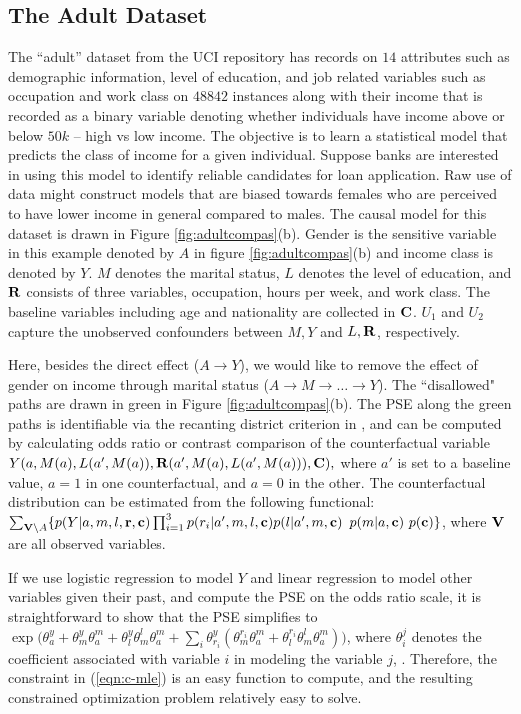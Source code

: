 \documentclass[letterpaper]{article} %
\newcommand{\citep}{\cite}
\newcommand{\T}{\theta}
\begin{document}
\subsection{The Adult Dataset}
The ``adult'' dataset from the UCI repository has records on $14$ attributes such as demographic information, level of education, and job related variables such as occupation and work class on $48842$ instances along with their income that is recorded as a binary variable denoting whether individuals have income above or below $50k$ -- high vs low income. The objective is to learn a statistical model that predicts the class of income for a given individual. Suppose  banks are interested in using this model to identify reliable candidates for loan application. Raw use of data might construct models that are biased towards females who are perceived to have lower income in general compared to males. The causal model for this dataset is drawn in Figure \ref{fig:adultcompas}(b). Gender is the sensitive variable in this example denoted by $A$ in figure \ref{fig:adultcompas}(b) and income class is denoted by $Y$. $M$ denotes the marital status, $L$ denotes the level of education, and $\bf R$ consists of three variables, occupation, hours per week, and work class. The baseline variables including age and nationality are collected in $\bf C$. $U_1$ and $U_2$ capture the unobserved confounders between $M,Y$ and $L, \bf R$, respectively. 

Here, besides the direct effect ($A\rightarrow Y$), we would like to remove the effect of gender on income through marital status ($A \rightarrow M \rightarrow \hdots \rightarrow Y$). The ``disallowed" paths are drawn in green in Figure \ref{fig:adultcompas}(b). 
The PSE along the green paths is identifiable via the recanting district criterion in \citep{shpitser13cogsci}, and can be computed by calculating odds ratio or contrast comparison of the counterfactual variable
$Y( a,  M(a),  L(a', M(a) ),  {\bf R} (a', M(a),  L(a', M(a) ) ), {\bf C}),$ where $a'$ is set to a baseline value, $a=1$ in one counterfactual, and $a=0$ in the other. The  counterfactual distribution can be estimated from the following functional: 
$\sum_{{\bf V} \setminus A} \{  p(Y | a, m, l, {\bf r, c}) \prod_{i = 1}^{3} p(r_i | a', m, l, {\bf c}) p(l | a', m, {\bf c})$
$p(m | a, {\bf c}) \ p(\bf c) \}$,
where ${\bf V}$ are all observed variables.

If we use logistic regression to model $Y$ and linear regression to model other variables given their past, and compute the PSE on the odds ratio scale, it is straightforward to show that the PSE simplifies to
$\exp\big( \T_a^y + \T_m^y\T_a^m + \T_l^y\T_m^l\T_a^m+ \sum_i\T_{r_i}^y(\T_m^{r_i}\T_a^m + \T_l^{r_i}\T_m^l\T_a^m)\big)$, where $\T_i^j$ denotes the coefficient associated with variable $i$ in modeling the variable $j$, \citep{tyler10odds}. Therefore, the constraint in (\ref{eqn:c-mle}) is an easy function to compute, and the resulting constrained optimization problem relatively easy to solve.
\end{document}
